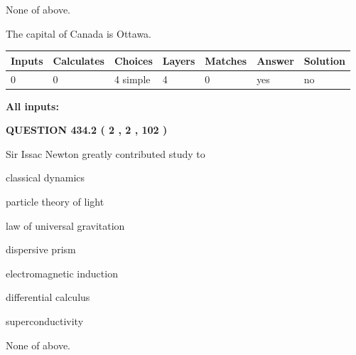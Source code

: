 \documentclass[12pt]{article}
\begin{document}
 
 None of above.
 
 
\noindent{}
 
 
The capital of Canada is Ottawa.
 
 
\noindent{}
 
 
   
   
   
   
\noindent\begin{tabular}{|l|l|l|l|l|l|l|}
 \hline
Inputs & Calculates & Choices & Layers & Matches & Answer & Solution \\ \hline
 0  & 
 0  & 
 4
  simple  
  & 
 4  & 
 0  & 
  yes & 
  no 
  \\ \hline
 \end{tabular}
   
   
   
   
\noindent{}
   
   
   
   
\noindent\vspace{0.1in}\hspace{-0.08in} {\textbf{\Large{All inputs: }}}
   
   
  
\vspace{0.2in}
  
{\textbf{\Large{QUESTION
434.2 
 ( 2 , 2 , 102 )
}}}
  
  
Sir Issac Newton greatly contributed study to
 
 
classical dynamics
 
 
particle theory of light
 
 
law of universal gravitation
 
 
dispersive prism
 
 
electromagnetic induction
 
 
differential calculus
 
 
superconductivity
 
 
 None of above.
 
\end{document}
